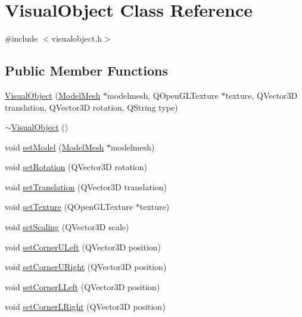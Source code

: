 \hypertarget{class_visual_object}{}\section{Visual\+Object Class Reference}
\label{class_visual_object}


{\ttfamily \#include $<$visualobject.\+h$>$}

\subsection*{Public Member Functions}
\begin{DoxyCompactItemize}
\item 
\hyperlink{class_visual_object_a0245f678c51843b881ad6a405c2fee92}{Visual\+Object} (\hyperlink{class_model_mesh}{Model\+Mesh} $\ast$modelmesh, Q\+Open\+G\+L\+Texture $\ast$texture, Q\+Vector3\+D translation, Q\+Vector3\+D rotation, Q\+String type)
\item 
\hyperlink{class_visual_object_a068ba11545322d81d9ad8c675c4233f9}{$\sim$\+Visual\+Object} ()
\item 
void \hyperlink{class_visual_object_a2eaddb04dc7308d10773fb2f31f65cda}{set\+Model} (\hyperlink{class_model_mesh}{Model\+Mesh} $\ast$modelmesh)
\item 
void \hyperlink{class_visual_object_a24f2c08777a07a60b99a80df23fead83}{set\+Rotation} (Q\+Vector3\+D rotation)
\item 
void \hyperlink{class_visual_object_ab792e48bfee0845359b2745c020388c6}{set\+Translation} (Q\+Vector3\+D translation)
\item 
void \hyperlink{class_visual_object_aa430ccc46042035b354846a4cf5ac227}{set\+Texture} (Q\+Open\+G\+L\+Texture $\ast$texture)
\item 
void \hyperlink{class_visual_object_ade6762a69a6879a3f0008e0158badd6c}{set\+Scaling} (Q\+Vector3\+D scale)
\item 
void \hyperlink{class_visual_object_adeee80fd1c697e4ef00e1cc254316b4e}{set\+Corner\+U\+Left} (Q\+Vector3\+D position)
\item 
void \hyperlink{class_visual_object_a26a9feed6b150951c216b44ae8c99490}{set\+Corner\+U\+Right} (Q\+Vector3\+D position)
\item 
void \hyperlink{class_visual_object_a81aa4ee45566bebe11c3b8e2782a692a}{set\+Corner\+L\+Left} (Q\+Vector3\+D position)
\item 
void \hyperlink{class_visual_object_ad4339a56428a82d6b1d59d78f7631016}{set\+Corner\+L\+Right} (Q\+Vector3\+D position)

\end{DoxyCompactItemize}
